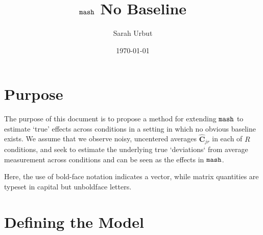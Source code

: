 \documentclass[11pt, oneside]{article}   	%
\title{ $\mash$ No Baseline}
\author{Sarah Urbut}
\date{\today}
\newcommand{\chat}{\bm{\hat{C}}}
\def\mash{{\tt mash }}
\begin{document}
\maketitle

\tableofcontents
\newpage

\section{Purpose}

The purpose of this document is to propose a method for extending $\mash$ to estimate `true' effects across conditions in a setting in which no obvious baseline exists. We assume that we observe noisy, uncentered averages $\chat_{jr}$ in each of $R$ conditions, and seek to estimate the underlying true `deviations` from average measurement across conditions and can be seen as the effects in $\mash$.

Here, the use of bold-face notation indicates a vector, while matrix quantities are typeset in capital but unboldface letters.



\section{Defining the Model}

% 
%
\end{document}
